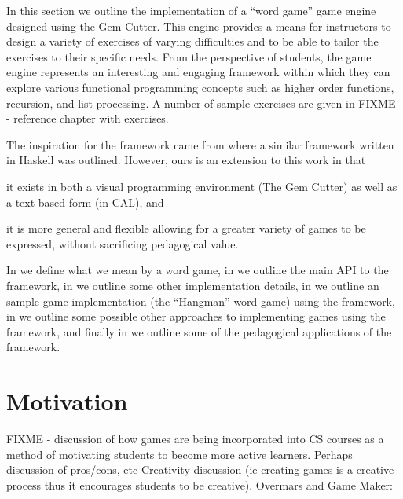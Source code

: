 \label{chapter:eval}

In this section we outline the implementation of a ``word game'' game engine designed using the Gem Cutter.  This engine provides a means for instructors to design a variety of exercises of varying difficulties and to be able to tailor the exercises to their specific needs.  From the perspective of students, the game engine represents an interesting and engaging framework within which they can explore various functional programming concepts such as higher order functions, recursion, and list processing.  A number of sample exercises are given in FIXME - reference chapter with exercises.

The inspiration for the framework came from \cite{Curtis05} where a similar framework written in Haskell was outlined.  However, ours is an extension to this work in that \begin{inparaenum}\item it exists in both a visual programming environment (The Gem Cutter) as well as a text-based form (in CAL), and \item it is more general and flexible allowing for a greater variety of games to be expressed, without sacrificing pedagogical value.\end{inparaenum}

In  we define what we mean by a word game, in  we outline the main API to the framework, in  we outline some other implementation details, in  we outline an sample game implementation (the ``Hangman'' word game) using the framework, in  we outline some possible other approaches to implementing games using the framework, and finally in  we outline some of the pedagogical applications of the framework.


\section{Motivation}
\label{wordGameMotivation}

FIXME - discussion of how games are being incorporated into CS courses as a method of motivating students to become more active learners.  Perhaps discussion of pros/cons, etc  Creativity discussion (ie creating games is a creative process thus it encourages students to be creative).  Overmars and Game Maker: \cite{Overmars04, Overmars05}

